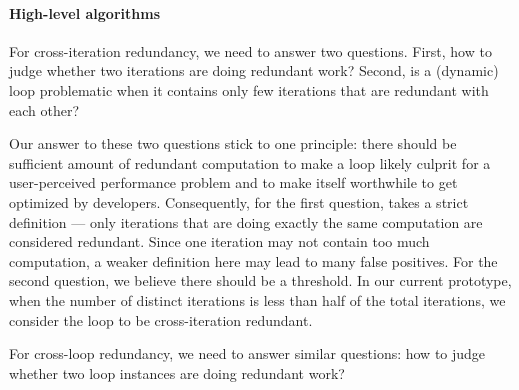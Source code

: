 \paragraph{High-level algorithms}
For cross-iteration redundancy, we need to answer two questions. 
First, how to judge whether
two iterations are doing redundant work?
Second, is a (dynamic) loop problematic when it contains only few 
iterations that are
redundant with each other?

Our answer to these two questions stick to one principle: there should be
sufficient amount of redundant computation to make a loop likely culprit
for a user-perceived performance problem and to make itself worthwhile to
get optimized by developers. Consequently,
for the first question, \Tool takes a strict 
definition --- only iterations that are doing exactly the same computation are
considered redundant. Since one iteration may not contain too much computation,
a weaker definition here may lead to many false positives. For the 
second question, we believe there should be a threshold. In our current 
prototype,
when the number of distinct iterations is less than half of the total iterations, 
we consider the loop to be cross-iteration redundant. 






For cross-loop redundancy, we need to answer similar questions:
how to judge whether two loop instances are doing redundant work?

